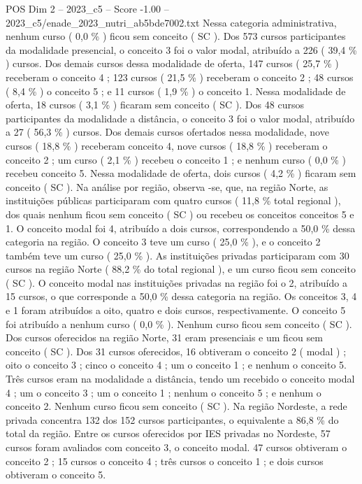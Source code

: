 \begin{textsample}{POS Dim 2 – 2023\_c5 – Score -1.00 – 2023\_c5/enade\_2023\_nutri\_ab5bde7002.txt}
Nessa categoria administrativa, nenhum curso ( 0,0 \% ) ficou sem conceito ( SC ).
Dos 573 cursos participantes da modalidade presencial, o conceito 3 foi o valor modal, atribuído a 226 ( 39,4 \% ) cursos.
Dos demais cursos dessa modalidade de oferta, 147 cursos ( 25,7 \% ) receberam o conceito 4 ; 123 cursos ( 21,5 \% ) receberam o conceito 2 ; 48 cursos ( 8,4 \% ) o conceito 5 ; e 11 cursos ( 1,9 \% ) o conceito 1.
Nessa modalidade de oferta, 18 cursos ( 3,1 \% ) ficaram sem conceito ( SC ).
Dos 48 cursos participantes da modalidade a distância, o conceito 3 foi o valor modal, atribuído a 27 ( 56,3 \% ) cursos.
Dos demais cursos ofertados nessa modalidade, nove cursos ( 18,8 \% ) receberam conceito 4, nove cursos ( 18,8 \% ) receberam o conceito 2 ; um curso ( 2,1 \% ) recebeu o conceito 1 ; e nenhum curso ( 0,0 \% ) recebeu conceito 5.
Nessa modalidade de oferta, dois cursos ( 4,2 \% ) ficaram sem conceito ( SC ).
Na análise por região, observa -se, que, na região Norte, as instituições públicas participaram com quatro cursos ( 11,8 \% total regional ), dos quais nenhum ficou sem conceito ( SC ) ou recebeu os conceitos conceitos 5 e 1.
O conceito modal foi 4, atribuído a dois cursos, correspondendo a 50,0 \% dessa categoria na região.
O conceito 3 teve um curso ( 25,0 \% ), e o conceito 2 também teve um curso ( 25,0 \% ).
As instituições privadas participaram com 30 cursos na região Norte ( 88,2 \% do total regional ), e um curso ficou sem conceito ( SC ).
O conceito modal nas instituições privadas na região foi o 2, atribuído a 15 cursos, o que corresponde a 50,0 \% dessa categoria na região.
Os conceitos 3, 4 e 1 foram atribuídos a oito, quatro e dois cursos, respectivamente.
O conceito 5 foi atribuído a nenhum curso ( 0,0 \% ).
Nenhum curso ficou sem conceito ( SC ).
Dos cursos oferecidos na região Norte, 31 eram presenciais e um ficou sem conceito ( SC ).
Dos 31 cursos oferecidos, 16 obtiveram o conceito 2 ( modal ) ; oito o conceito 3 ; cinco o conceito 4 ; um o conceito 1 ; e nenhum o conceito 5.
Três cursos eram na modalidade a distância, tendo um recebido o conceito modal 4 ; um o conceito 3 ; um o conceito 1 ; nenhum o conceito 5 ; e nenhum o conceito 2.
Nenhum curso ficou sem conceito ( SC ).
Na região Nordeste, a rede privada concentra 132 dos 152 cursos participantes, o equivalente a 86,8 \% do total da região.
Entre os cursos oferecidos por IES privadas no Nordeste, 57 cursos foram avaliados com conceito 3, o conceito modal. 47 cursos obtiveram o conceito 2 ; 15 cursos o conceito 4 ; três cursos o conceito 1 ; e dois cursos obtiveram o conceito 5.

\end{textsample}
